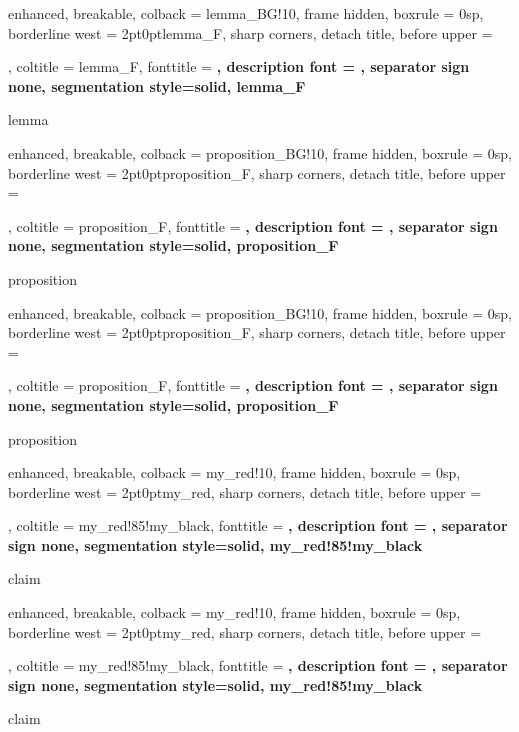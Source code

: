 {
	enhanced,
	breakable,
	colback = lemma_BG!10,
	frame hidden,
	boxrule = 0sp,
	borderline west = {2pt}{0pt}{lemma_F},
	sharp corners,
	detach title,
	before upper = \tcbtitle\par\smallskip,
	coltitle = lemma_F,
	fonttitle = \bfseries\sffamily,
	description font = \mdseries,
	separator sign none,
	segmentation style={solid, lemma_F}
}
{lemma}

{
	enhanced,
	breakable,
	colback = proposition_BG!10,
	frame hidden,
	boxrule = 0sp,
	borderline west = {2pt}{0pt}{proposition_F},
	sharp corners,
	detach title,
	before upper = \tcbtitle\par\smallskip,
	coltitle = proposition_F,
	fonttitle = \bfseries\sffamily,
	description font = \mdseries,
	separator sign none,
	segmentation style={solid, proposition_F}
}
{proposition}

{
	enhanced,
	breakable,
	colback = proposition_BG!10,
	frame hidden,
	boxrule = 0sp,
	borderline west = {2pt}{0pt}{proposition_F},
	sharp corners,
	detach title,
	before upper = \tcbtitle\par\smallskip,
	coltitle = proposition_F,
	fonttitle = \bfseries\sffamily,
	description font = \mdseries,
	separator sign none,
	segmentation style={solid, proposition_F}
}
{proposition}

{
	enhanced,
	breakable,
	colback = my_red!10,
	frame hidden,
	boxrule = 0sp,
	borderline west = {2pt}{0pt}{my_red},
	sharp corners,
	detach title,
	before upper = \tcbtitle\par\smallskip,
	coltitle = my_red!85!my_black,
	fonttitle = \bfseries\sffamily,
	description font = \mdseries,
	separator sign none,
	segmentation style={solid, my_red!85!my_black}
}
{claim}

{
	enhanced,
	breakable,
	colback = my_red!10,
	frame hidden,
	boxrule = 0sp,
	borderline west = {2pt}{0pt}{my_red},
	sharp corners,
	detach title,
	before upper = \tcbtitle\par\smallskip,
	coltitle = my_red!85!my_black,
	fonttitle = \bfseries\sffamily,
	description font = \mdseries,
	separator sign none,
	segmentation style={solid, my_red!85!my_black}
}
{claim}

